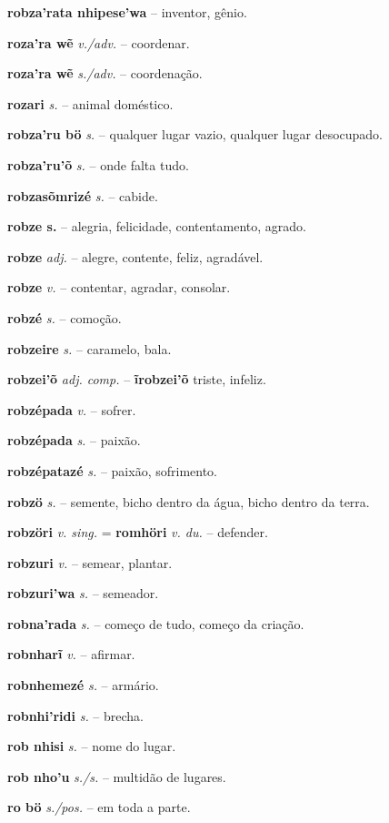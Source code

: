 \textbf{robza'rata nhipese'wa} \textit{} -- inventor, gênio.

\textbf{roza'ra wẽ} \textit{v./adv.} -- coordenar.

\textbf{roza'ra wẽ} \textit{s./adv.} -- coordenação.

\textbf{rozari} \textit{s.} -- animal doméstico.

\textbf{robza'ru bö} \textit{s.} -- qualquer lugar vazio, qualquer lugar desocupado.

\textbf{robza'ru'õ} \textit{s.} -- onde falta tudo.

\textbf{robzasõmrizé} \textit{s.} -- cabide.

\textbf{robze s.} -- alegria, felicidade, contentamento, agrado.

\textbf{robze} \textit{adj.} -- alegre, contente, feliz, agradável.

\textbf{robze} \textit{v.} -- contentar, agradar, consolar.

\textbf{robzé} \textit{s.} -- comoção.

\textbf{robzeire} \textit{s.} -- caramelo, bala.

\textbf{robzei'õ} \textit{adj. comp.} -- \textbf{ĩrobzei'õ} triste, infeliz.

\textbf{robzépada} \textit{v.} -- sofrer.

\textbf{robzépada} \textit{s.} -- paixão.

\textbf{robzépatazé} \textit{s.} -- paixão, sofrimento.

\textbf{robzö} \textit{s.} -- semente, bicho dentro da água, bicho dentro da terra.

\textbf{robzöri} \textit{v. sing.} = \textbf{romhöri} \textit{v. du.} -- defender.

\textbf{robzuri} \textit{v.} -- semear, plantar.

\textbf{robzuri'wa} \textit{s.} -- semeador.

\textbf{robna'rada} \textit{s.} -- começo de tudo, começo da criação.

\textbf{robnharĩ} \textit{v.} -- afirmar.

\textbf{robnhemezé} \textit{s.} -- armário.

\textbf{robnhi'ridi} \textit{s.} -- brecha.

\textbf{rob nhisi} \textit{s.} -- nome do lugar.

\textbf{rob nho'u} \textit{s./s.} -- multidão de lugares.

\textbf{ro bö} \textit{s./pos.} -- em toda a parte.

